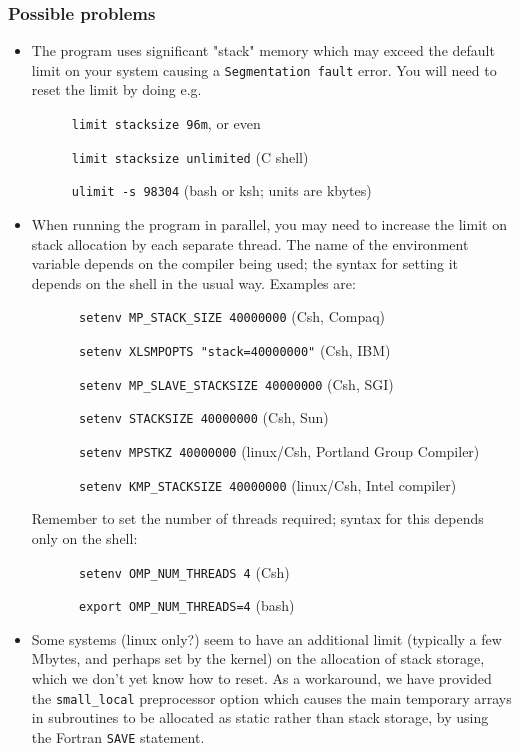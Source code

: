 \documentclass[11pt, a4paper,twoside]{article}
\numberwithin{equation}{section}
\begin{document}
\subsubsection{Possible problems}\label{sub:probs}
\begin{itemize}
\item The program uses significant "stack" memory which may exceed the default limit on your system causing a  \verb=Segmentation fault= error.
You will need to reset the limit by doing e.g.
\begin{description}
\item[]  \verb=limit stacksize 96m=,  or even
\item[]  \verb=limit stacksize unlimited=  (C shell)
\item[]  \verb=ulimit -s 98304=       (bash or ksh; units are kbytes)
\end{description}
\item When running the program in parallel, you may need to increase the limit  on stack allocation by each separate thread.
The name of the environment variable depends on the compiler being used; the syntax for setting it depends on the shell in the usual way.
Examples are:
\begin{description}
\item[]  \verb= setenv MP_STACK_SIZE 40000000= (Csh, Compaq)
\item[]  \verb- setenv XLSMPOPTS "stack=40000000"- (Csh, IBM)
\item[]  \verb= setenv MP_SLAVE_STACKSIZE 40000000= (Csh, SGI)
\item[]  \verb= setenv STACKSIZE 40000000=  (Csh, Sun)
\item[]  \verb= setenv MPSTKZ 40000000= (linux/Csh, Portland Group Compiler)
\item[]  \verb= setenv KMP_STACKSIZE 40000000= (linux/Csh, Intel compiler)
\end{description}
Remember to set the number of threads required; syntax for this depends only on the shell:
\begin{description}
\item[]  \verb= setenv OMP_NUM_THREADS 4= (Csh)
\item[]  \verb+ export OMP_NUM_THREADS=4+ (bash)
\end{description}
\item Some systems (linux only?) seem to have an additional limit (typically a few Mbytes, and perhaps set by the kernel) on the allocation of stack storage, which we don't yet know how to reset.
As a workaround, we have provided the \verb=small_local= preprocessor option which causes the main temporary arrays in subroutines to be allocated as static rather than stack storage, by using the Fortran \verb=SAVE= statement.

\end{itemize}
\end{document}
